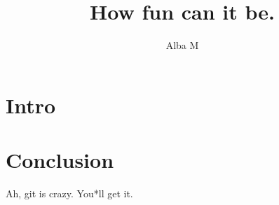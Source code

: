 \documentclass{article}
\author{Alba M}
\title{How fun can it be.}
\begin{document}
	\maketitle
	\section{Intro}
	\section{Conclusion}
	Ah, git is crazy. You*ll get it.
\end{document}

